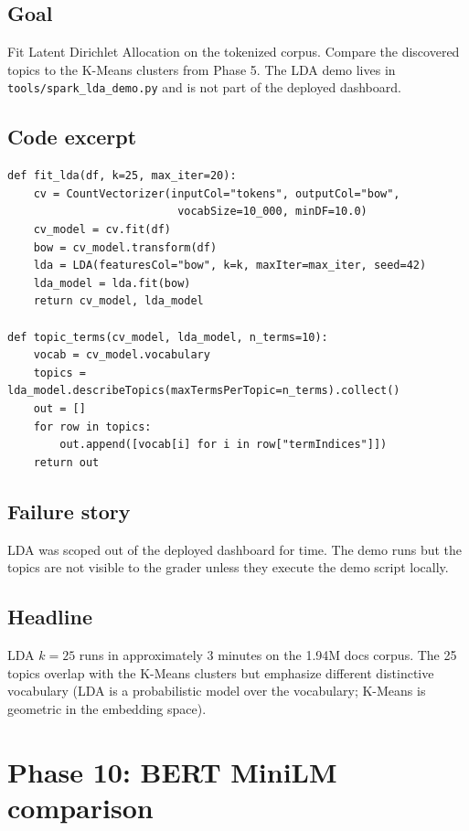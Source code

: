 \documentclass[11pt,letterpaper]{book}
\begin{document}
\subsection*{Goal}

Fit Latent Dirichlet Allocation \cite{blei2003lda} on the tokenized corpus. Compare the discovered topics to the K-Means clusters from Phase 5. The LDA demo lives in \texttt{tools/spark\_lda\_demo.py} and is not part of the deployed dashboard.

\subsection*{Code excerpt}

\begin{lstlisting}
def fit_lda(df, k=25, max_iter=20):
    cv = CountVectorizer(inputCol="tokens", outputCol="bow",
                          vocabSize=10_000, minDF=10.0)
    cv_model = cv.fit(df)
    bow = cv_model.transform(df)
    lda = LDA(featuresCol="bow", k=k, maxIter=max_iter, seed=42)
    lda_model = lda.fit(bow)
    return cv_model, lda_model

def topic_terms(cv_model, lda_model, n_terms=10):
    vocab = cv_model.vocabulary
    topics = lda_model.describeTopics(maxTermsPerTopic=n_terms).collect()
    out = []
    for row in topics:
        out.append([vocab[i] for i in row["termIndices"]])
    return out
\end{lstlisting}

\subsection*{Failure story}

LDA was scoped out of the deployed dashboard for time. The demo runs but the topics are not visible to the grader unless they execute the demo script locally.

\subsection*{Headline}

LDA $k=25$ runs in approximately 3 minutes on the 1.94M docs corpus. The 25 topics overlap with the K-Means clusters but emphasize different distinctive vocabulary (LDA is a probabilistic model over the vocabulary; K-Means is geometric in the embedding space).

\section{Phase 10: BERT MiniLM comparison}
\label{sec:phase10}
\end{document}
